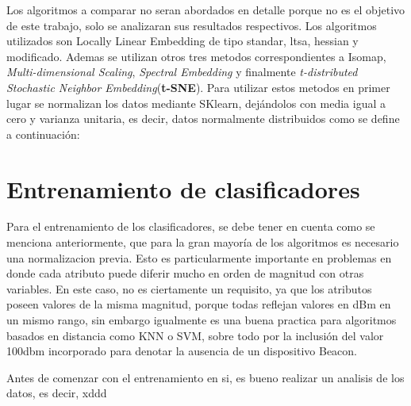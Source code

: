 Los algoritmos a comparar no seran abordados en detalle porque no es el objetivo de este trabajo, solo se analizaran sus resultados respectivos. Los algoritmos utilizados son Locally Linear Embedding de tipo standar, ltsa, hessian y modificado. Ademas se utilizan otros tres metodos correspondientes a Isomap, \textit{Multi-dimensional Scaling}, \textit{Spectral Embedding} y finalmente \textit{t-distributed Stochastic Neighbor Embedding}(\textbf{t-SNE}). Para utilizar estos metodos en primer lugar se normalizan los datos mediante SKlearn, dejándolos con media igual a cero y varianza unitaria, es decir, datos normalmente distribuidos como se define a continuación:


\section{Entrenamiento de clasificadores}

Para el entrenamiento de los clasificadores, se debe tener en cuenta como se menciona anteriormente, que para la gran mayoría de los algoritmos es necesario una normalizacion previa. Esto es particularmente importante en problemas en donde cada atributo puede diferir mucho en orden de magnitud con otras variables. En este caso, no es ciertamente un requisito, ya que los atributos poseen valores de la misma magnitud, porque todas reflejan valores en dBm en un mismo rango, sin embargo igualmente es una buena practica para algoritmos basados en distancia como KNN o SVM, sobre todo por la inclusión del valor 100dbm incorporado para denotar la ausencia de un dispositivo Beacon.

Antes de comenzar con el entrenamiento en si, es bueno realizar un analisis de los datos, es decir, xddd